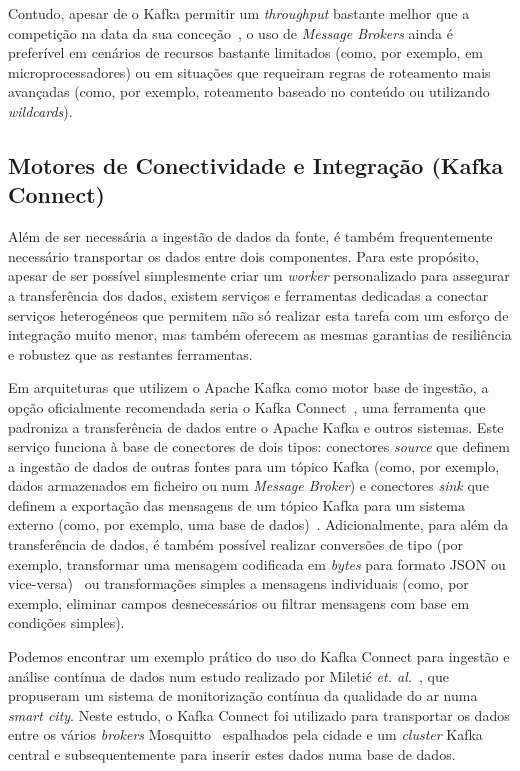 Contudo, apesar de o Kafka permitir um \textit{throughput} bastante melhor que a competição na data da sua conceção~\cite{Kafka2011}, o uso de \textit{Message Brokers} ainda é preferível em cenários de recursos bastante limitados (como, por exemplo, em microprocessadores) ou em situações que requeiram regras de roteamento mais avançadas (como, por exemplo, roteamento baseado no conteúdo ou utilizando \textit{wildcards}).


\subsection{Motores de Conectividade e Integração (Kafka Connect)}

Além de ser necessária a ingestão de dados da fonte, é também frequentemente necessário transportar os dados entre dois componentes.
Para este propósito, apesar de ser possível simplesmente criar um \textit{worker} personalizado para assegurar a transferência dos dados, existem serviços e ferramentas dedicadas a conectar serviços heterogéneos que permitem não só realizar esta tarefa com um esforço de integração muito menor, mas também oferecem as mesmas garantias de resiliência e robustez que as restantes ferramentas.

Em arquiteturas que utilizem o Apache Kafka como motor base de ingestão, a opção oficialmente recomendada seria o Kafka Connect~\cite{kafka_connect_docs}, uma ferramenta que padroniza a transferência de dados entre o Apache Kafka e outros sistemas. Este serviço funciona à base de conectores de dois tipos: conectores \textit{source} que definem a ingestão de dados de outras fontes para um tópico Kafka (como, por exemplo, dados armazenados em ficheiro ou num \textit{Message Broker}) e conectores \textit{sink} que definem a exportação das mensagens de um tópico Kafka para um sistema externo (como, por exemplo, uma base de dados)~\cite{kafka_connect_docs}.
Adicionalmente, para além da transferência de dados, é também possível realizar conversões de tipo (por exemplo, transformar uma mensagem codificada em \textit{bytes} para formato \ac{JSON} ou vice-versa)~\cite{kafka_connect_docs} ou transformações simples a mensagens individuais (como, por exemplo, eliminar campos desnecessários ou filtrar mensagens com base em condições simples).~\cite{kafka_connect_docs_smt}

Podemos encontrar um exemplo prático do uso do Kafka Connect para ingestão e análise contínua de dados num estudo realizado por Mileti\'{c} \textit{et. al.}~\cite{Mileti2023}, que propuseram um sistema de monitorização contínua da qualidade do ar numa \textit{smart city}.
Neste estudo, o Kafka Connect foi utilizado para transportar os dados entre os vários \textit{brokers} Mosquitto~\cite{Mosquitto_main} espalhados pela cidade e um \textit{cluster} Kafka central e subsequentemente para inserir estes dados numa base de dados.

